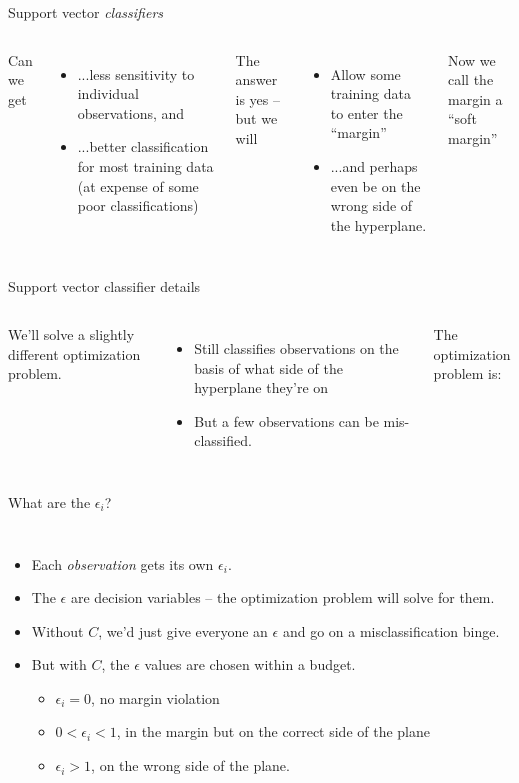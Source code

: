 \documentclass[mathserif, aspectratio=169]{beamer}
\begin{document}
\begin{frame}{Support vector \textit{classifiers}}
\begin{columns}
Can we get
\begin{itemize}
\item ...less sensitivity to individual observations, and
\item ...better classification for most training data (at expense of some poor classifications)
\end{itemize}
The answer is yes -- but we will
\begin{itemize}
\item Allow some training data to enter the ``margin''
\item ...and perhaps even be on the wrong side of the hyperplane.
\end{itemize}
Now we call the margin a ``soft margin''

\end{columns}
\end{frame}

\begin{frame}{Support vector classifier details}

\begin{columns}
We'll solve a slightly different optimization problem.
\begin{itemize}
\item Still classifies observations on the basis of what side of the hyperplane they're on
\item But a few observations can be mis-classified.
\end{itemize}
The optimization problem is: 
\vspace{40mm}
\end{columns}
\end{frame}

\begin{frame}{What are the $\epsilon_i$?}

\begin{columns}
\begin{itemize}
\item Each \textit{observation} gets its own $\epsilon_i$.  
\item The $\epsilon$ are decision variables -- the optimization problem will solve for them.  
\item Without $C$, we'd just give everyone an $\epsilon$ and go on a misclassification binge.  
\item But with $C$, the $\epsilon$ values are chosen within a budget. 
\begin{itemize}
\item $\epsilon_i = 0$, no margin violation
\item $0<\epsilon_i<1$, in the margin but on the correct side of the plane
\item  $\epsilon_i>1$, on the wrong side of the plane.  
\end{itemize}
\end{itemize}
\end{columns}
\end{frame}
\end{document}
